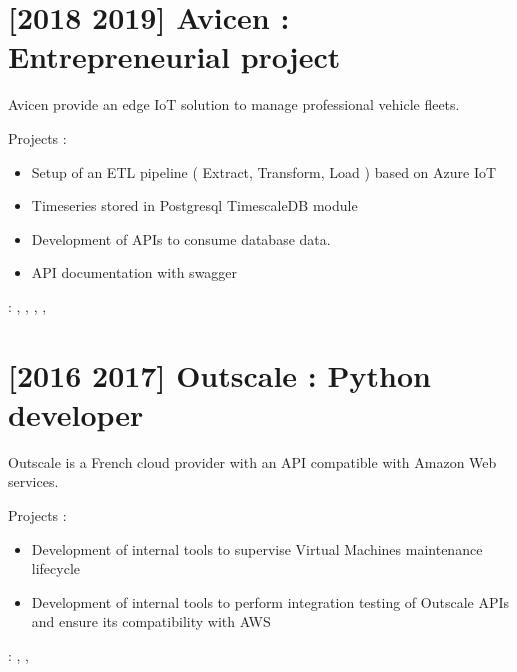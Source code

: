 \documentclass[letterpaper,10pt,english]{sphinxmanual}
\begin{document}
\section{{[}2018 \sphinxhyphen{} 2019{]} Avicen : Entrepreneurial project}
\label{\detokenize{index:avicen-entrepreneurial-project}}
\sphinxAtStartPar
Avicen provide an edge IoT solution to manage professional vehicle fleets.

\sphinxAtStartPar
Projects :
\begin{itemize}
\item {} 
\sphinxAtStartPar
Setup of an ETL pipeline ( Extract, Transform, Load ) based on Azure IoT

\item {} 
\sphinxAtStartPar
Timeseries stored in Postgresql TimescaleDB module

\item {} 
\sphinxAtStartPar
Development of APIs to consume database data.

\item {} 
\sphinxAtStartPar
API documentation with swagger

\end{itemize}

\sphinxAtStartPar
{} : , , , , 


\section{{[}2016 \sphinxhyphen{} 2017{]} Outscale : Python developer}
\label{\detokenize{index:outscale-python-developer}}
\sphinxAtStartPar
Outscale is a French cloud provider with an API compatible with Amazon Web services.

\sphinxAtStartPar
Projects :
\begin{itemize}
\item {} 
\sphinxAtStartPar
Development of internal tools to supervise Virtual Machines maintenance lifecycle

\item {} 
\sphinxAtStartPar
Development of internal tools to perform integration testing of Outscale APIs and ensure its compatibility with AWS

\end{itemize}

\sphinxAtStartPar
{} : , , 
\end{document}
